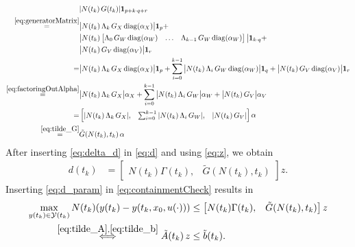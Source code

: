 \documentclass[EPiC]{easychair}
\renewcommand{\^}[1]{^{(#1)}}
\begin{document}
\begin{equation} \label{eq:delta_d}
\begin{split}
 & |N(t_k) \, G(t_k)|\mathbf{1}_{p+k\cdot q+r} \\
 \overset{\eqref{eq:generatorMatrix}}{=}& \big|N(t_k) \, \Lambda_k  \, G_X \, \mathrm{diag}(\alpha_X)\big|\mathbf{1}_p + \\
 & \big|N(t_k) \begin{bmatrix} \Lambda_0  \, G_W \, \mathrm{diag}(\alpha_W) & \ldots & \Lambda_{k-1} \, G_W \, \mathrm{diag}(\alpha_W) \end{bmatrix} \big|\mathbf{1}_{k\cdot q} + \\
 & \big|N(t_k) \, G_V \, \mathrm{diag}(\alpha_V)\big|\mathbf{1}_r \\
 =& \big|N(t_k) \, \Lambda_k \, G_X \, \mathrm{diag}(\alpha_X)\big|\mathbf{1}_p + \sum_{i=0}^{k-1} \big|N(t_k) \, \Lambda_i  \, G_W \, \mathrm{diag}(\alpha_W) \big|\mathbf{1}_q + \big|N(t_k) \, G_V \, \mathrm{diag}(\alpha_V)\big|\mathbf{1}_r \\
 \overset{\eqref{eq:factoringOutAlpha}}{=}& \big|N(t_k) \, \Lambda_k \, G_X\big| \alpha_X +\sum_{i=0}^{k-1} \big|N(t_k) \, \Lambda_i \, G_W \big|\alpha_W + \big|N(t_k) \, G_V \big|\alpha_V \\
   =& \begin{bmatrix} 
       |N(t_k) \, \Lambda_k \, G_X|, & \sum_{i=0}^{k-1} |N(t_k) \, \Lambda_i \, G_W |, & |N(t_k) \, G_V |
      \end{bmatrix} \alpha \\
 \overset{\eqref{eq:tilde_G}}{=}&  \tilde{G}(N(t_k),t_k) \, \alpha
 \end{split}
\end{equation}
After inserting \eqref{eq:delta_d} in \eqref{eq:d} and using \eqref{eq:z}, we obtain
\begin{equation} \label{eq:d_param}
\begin{split}
	d(t_k) &= \begin{bmatrix} 
       N(t_k)\Gamma(t_k), & \tilde{G}(N(t_k),t_k)
      \end{bmatrix} z.
\end{split}
\end{equation}
Inserting \eqref{eq:d_param} in \eqref{eq:containmentCheck} results in
\begin{equation*} 
\begin{split}
 \max_{y(t_k) \in \mathcal{Y}(t_k)} N(t_k) (y(t_k) - y(t_k,x_0,u(\cdot))) & \leq \begin{bmatrix} 
       N(t_k)\Gamma(t_k), & \tilde{G}(N(t_k),t_k)
      \end{bmatrix} z \\
 \overset{\eqref{eq:tilde_A},\eqref{eq:tilde_b}}{\Longleftrightarrow} \tilde{A}(t_k)\, z & \leq \tilde{b}(t_k).
\end{split}
\end{equation*}
\end{document}
